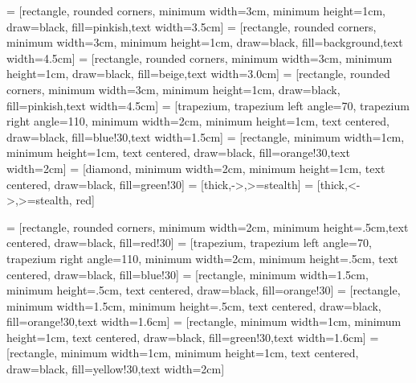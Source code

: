 \usepackage{graphicx}
\usepackage{hyperref, url}
\hypersetup{colorlinks,citecolor=myorange,filecolor=red,linkcolor=brown,urlcolor=blue}

\usepackage{longtable,booktabs}

\usepackage{subfig}
\usepackage{tikz}
\usetikzlibrary{shapes.geometric, arrows,shapes.symbols,decorations.pathreplacing}
 = [rectangle, rounded corners, minimum width=3cm, minimum height=1cm, draw=black, fill=pinkish,text width=3.5cm]
 = [rectangle, rounded corners, minimum width=3cm, minimum height=1cm, draw=black, fill=background,text width=4.5cm]
 = [rectangle, rounded corners, minimum width=3cm, minimum height=1cm, draw=black, fill=beige,text width=3.0cm]
 = [rectangle, rounded corners, minimum width=3cm, minimum height=1cm, draw=black, fill=pinkish,text width=4.5cm]
 = [trapezium, trapezium left angle=70, trapezium right angle=110, minimum width=2cm, minimum height=1cm, text centered, draw=black, fill=blue!30,text width=1.5cm]
 = [rectangle, minimum width=1cm, minimum height=1cm, text centered, draw=black, fill=orange!30,text width=2cm]
 = [diamond, minimum width=2cm, minimum height=1cm, text centered, draw=black, fill=green!30]
 = [thick,->,>=stealth]
 = [thick,<->,>=stealth, red]


 = [rectangle, rounded corners, minimum width=2cm, minimum height=.5cm,text centered, draw=black, fill=red!30]
 = [trapezium, trapezium left angle=70, trapezium right angle=110, minimum width=2cm, minimum height=.5cm, text centered, draw=black, fill=blue!30]
 = [rectangle, minimum width=1.5cm, minimum height=.5cm, text centered, draw=black, fill=orange!30]
 = [rectangle, minimum width=1.5cm, minimum height=.5cm, text centered, draw=black, fill=orange!30,text width=1.6cm]
 = [rectangle, minimum width=1cm, minimum height=1cm, text centered, draw=black, fill=green!30,text width=1.6cm]
 = [rectangle, minimum width=1cm, minimum height=1cm, text centered, draw=black, fill=yellow!30,text width=2cm]





\usepackage{color, colortbl,xcolor}

